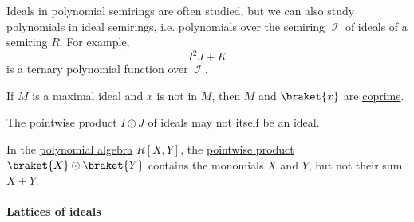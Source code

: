 \begin{example}
\begin{thmenum}
     Ideals in polynomial semirings are often studied, but we can also study polynomials in ideal semirings, i.e. polynomials over the semiring \( \mscrI \) of ideals of a semiring \( R \). For example,
    \begin{equation*}
      I^2 J + K
    \end{equation*}
    is a ternary polynomial function over \( \mscrI \).

     If \( M \) is a maximal ideal and \( x \) is not in \( M \), then \( M \) and \( \braket{ x } \) are \hyperref[def:semiring_ideal/coprime]{coprime}.

     The pointwise product \( I \odot J \) of ideals may not itself be an ideal.

    In the \hyperref[def:polynomial_algebra]{polynomial algebra} \( R[X, Y] \), the \hyperref[def:power_semigroup]{pointwise product} \( \braket{ X } \odot \braket{ Y } \) contains the monomials \( X \) and \( Y \), but not their sum \( X + Y \).
  \end{thmenum}
\end{example}

\paragraph{Lattices of ideals}

